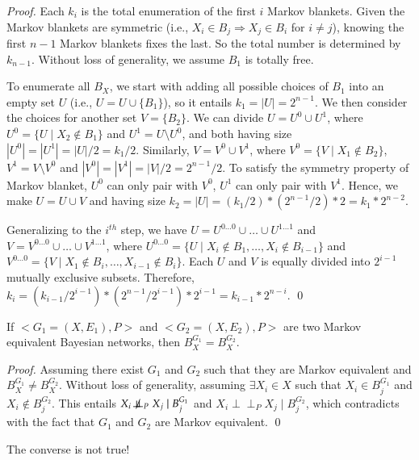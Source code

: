 \begin{proof}
Each $k_i$ is the total enumeration of the first $i$ Markov blankets. Given the Markov blankets are symmetric (i.e., $X_i \in B_j \Rightarrow X_j \in B_i$ for $i\neq j$), knowing the first $n-1$ Markov blankets fixes the last. So the total number is determined by $k_{n-1}$. Without loss of generality, we assume $B_1$ is totally free.

To enumerate all $B_X$, we start with adding all possible choices of $B_1$ into an empty set $U$ (i.e., $U = U \cup \{B_1\}$), so it entails $k_1 = |U| = 2^{n-1}$. We then consider the choices for another set $V = \{B_2\}$. We can divide $U = U^0 \cup U^1$, where $U^0 = \{U \mid X_2 \notin B_1\}$ and $U^1 = U \setminus U^0$, and both having size $|U^{0}| = |U^{1}| = |U|/2 =k_1/2$. Similarly, $V = V^0 \cup V^1$, where $V^0 = \{V \mid X_1 \notin B_2\}$, $V^1 = V\setminus V^0$ and $|V^0| = |V^1| = |V|/2=2^{n-1}/2$. To satisfy the symmetry property of Markov blanket, $U^0$ can only pair with $V^0$, $U^1$ can only pair with $V^1$. Hence, we make $U = U \cup V$ and having size $k_2 = |U| = (k_1/2) * (2^{n-1}/2) * 2 = k_1 * 2^{n-2}$.

Generalizing to the $i^{th}$ step, we have $U = U^{0\dots 0} \cup \dots \cup U^{1 \dots 1}$ and $V = V^{0\dots 0} \cup \dots \cup V^{1 \dots 1}$, where $U^{0\dots 0} = \{U \mid X_i \notin B_1, \dots, X_i \notin B_{i-1}\}$ and $V^{0\dots 0} = \{V \mid X_1 \notin B_i, \dots, X_{i-1} \notin B_i\}$. Each $U$ and $V$ is equally divided into $2^{i-1}$ mutually exclusive subsets. Therefore, $k_i = (k_{i-1}/2^{i-1}) * (2^{n-1}/2^{i-1})* 2^{i-1} = k_{i-1} * 2^{n-i}$. \qed
\end{proof}

\begin{proposition}
If $<G_1=(X,E_1), P>$ and $<G_2=(X,E_2), P>$ are two Markov equivalent Bayesian networks, then $B_X^{G_1} = B_X^{G_2}$. 
\end{proposition}

\begin{proof}
Assuming there exist $G_1$ and $G_2$ such that they are Markov equivalent and $B_X^{G_1} \neq B_X^{G_2}$. Without loss of generality, assuming $\exists X_i \in X$ such that $X_i \in B_j^{G_1}$ and $X_i \notin B_j^{G_2}$. This entails $X_i \not\!\perp\!\!\!\perp_P X_j \mid B_j^{G_1}$ and $X_i \!\perp\!\!\!\perp_P X_j \mid B_j^{G_2}$, which contradicts with the fact that $G_1$ and $G_2$ are Markov equivalent. \qed
\end{proof}
The converse is not true!
\fi

